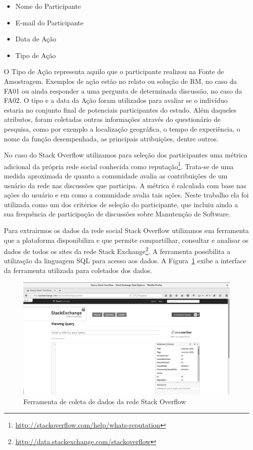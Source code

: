 \begin{itemize}
	\item Nome do Participante
	\item E-mail do Participante
	\item Data de Ação
	\item Tipo de Ação
\end{itemize}

O Tipo de Ação representa aquilo que o participante realizou na Fonte de
Amostragem. Exemplos de ação estão no relato ou solução de RM, no caso da FA01 ou
ainda responder a uma pergunta de determinada discussão, no caso da FA02. O tipo
e a data da Ação foram utilizados para avaliar se o indivíduo estaria no
conjunto final de potenciais participantes do estudo. Além daqueles atributos,
foram coletadas outras informações através do questionário de pesquisa, como por
exemplo a localização geográfica, o tempo de experiência, o nome da função
desempenhada, as principais atribuições, dentre outros.

No caso do Stack Overflow utilizamos para seleção dos participantes uma métrica
adicional da própria rede social conhecida como
reputação\footnote{\url{http://stackoverflow.com/help/whats-reputation}}.
Trata-se de uma medida aproximada de quanto a comunidade avalia as contribuições
de um usuário da rede nas discussões que participa. A métrica é calculada com
base nas ações do usuário e em como a comunidade avalia tais ações. Neste
trabalho ela foi utilizada como um dos critérios de seleção do participante, que
incluiu ainda a sua frequência de participação de discussões sobre Manutenção de
Software.

Para  extrairmos os dados da rede social Stack Overflow utilizamos sua
ferramenta que a plataforma disponibiliza e que permite compartilhar, consultar
e analisar os dados de todos os sites da rede Stack
Exchange\footnote{\url{http://data.stackexchange.com/stackoverflow}}. A
ferramenta possibilita a utilização da linguagem SQL para acesso aos dados. A
Figura~\ref{fig:stack-exchange} exibe a interface da ferramenta utilizada para
coletados dos dados.

\begin{figure}[htpb]
	\centering
	\includegraphics[width=0.5\linewidth]{./chapter-pesquisa-com-profissionais/img/stack-exchange.png}
	\caption{Ferramenta de coleta de dados da rede Stack Overflow}
\label{fig:stack-exchange}
\end{figure}

